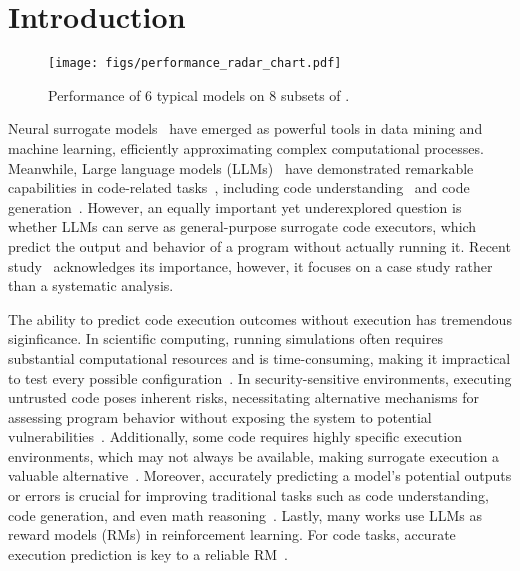 \section{Introduction}

\begin{figure}[!t]
    \centering
    \texttt{[image: figs/performance\_radar\_chart.pdf]}
    \caption{Performance of $6$ typical models on $8$ subsets of \bench.}
    \label{fig:case1}
\end{figure}

Neural surrogate models~\citep{zhang2024artificialintelligencesciencequantum, sun2019review} have emerged as powerful tools in data mining and machine learning, efficiently approximating complex computational processes. Meanwhile, Large language models (LLMs)~\citep{reid2024gemini, llama3, claude3, hui2024qwen2, bi2024deepseek} have demonstrated remarkable capabilities in code-related tasks~\citep{lu2021codexglue, zheng2023codegeex, luo2023wizardcoder, codeqwen, guo2024deepseek}, including code understanding~\citep{ahmad2020transformer, chakraborty2020deep} and code generation~\citep{li2017code, parvez2018building}. However, an equally important yet underexplored question is whether LLMs can serve as general-purpose surrogate code executors, which predict the output and behavior of a program without actually running it. Recent study~\citep{lyu2024largelanguagemodelscode} acknowledges its importance, however, it focuses on a case study rather than a systematic analysis.

The ability to predict code execution outcomes without execution has tremendous siginficance. In scientific computing, running simulations often requires substantial computational resources and is time-consuming, making it impractical to test every possible configuration~\citep{lu2019efficientsurrogatemodelingmethods, Non-intrusive, doi:10.1137/130932715}. In security-sensitive environments, executing untrusted code poses inherent risks, necessitating alternative mechanisms for assessing program behavior without exposing the system to potential vulnerabilities~\citep{nebbione2023methodological, ccs, wang2024uniquesecurityprivacythreats}. Additionally, some code requires highly specific execution environments, which may not always be available, making surrogate execution a valuable alternative~\citep{10.1145/3617591, gu2025softwaretestingextendedreality}. Moreover, accurately predicting a model’s potential outputs or errors is crucial for improving traditional tasks such as code understanding, code generation, and even math reasoning~\citep{li2025codeiocondensingreasoningpatterns}. Lastly, many works use LLMs as reward models (RMs) in reinforcement learning. For code tasks, accurate execution prediction is key to a reliable RM~\citep{ouyang2022traininglanguagemodelsfollow}.

